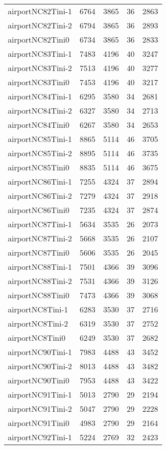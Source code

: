 \begin{longtable}{lrrrr}
airportNC82Tini-1 & 6764 & 3865 & 36 & 2863 \\
airportNC82Tini-2 & 6794 & 3865 & 36 & 2893 \\
airportNC82Tini0 & 6734 & 3865 & 36 & 2833 \\
airportNC83Tini-1 & 7483 & 4196 & 40 & 3247 \\
airportNC83Tini-2 & 7513 & 4196 & 40 & 3277 \\
airportNC83Tini0 & 7453 & 4196 & 40 & 3217 \\
airportNC84Tini-1 & 6295 & 3580 & 34 & 2681 \\
airportNC84Tini-2 & 6327 & 3580 & 34 & 2713 \\
airportNC84Tini0 & 6267 & 3580 & 34 & 2653 \\
airportNC85Tini-1 & 8865 & 5114 & 46 & 3705 \\
airportNC85Tini-2 & 8895 & 5114 & 46 & 3735 \\
airportNC85Tini0 & 8835 & 5114 & 46 & 3675 \\
airportNC86Tini-1 & 7255 & 4324 & 37 & 2894 \\
airportNC86Tini-2 & 7279 & 4324 & 37 & 2918 \\
airportNC86Tini0 & 7235 & 4324 & 37 & 2874 \\
airportNC87Tini-1 & 5634 & 3535 & 26 & 2073 \\
airportNC87Tini-2 & 5668 & 3535 & 26 & 2107 \\
airportNC87Tini0 & 5606 & 3535 & 26 & 2045 \\
airportNC88Tini-1 & 7501 & 4366 & 39 & 3096 \\
airportNC88Tini-2 & 7531 & 4366 & 39 & 3126 \\
airportNC88Tini0 & 7473 & 4366 & 39 & 3068 \\
airportNC8Tini-1 & 6283 & 3530 & 37 & 2716 \\
airportNC8Tini-2 & 6319 & 3530 & 37 & 2752 \\
airportNC8Tini0 & 6249 & 3530 & 37 & 2682 \\
airportNC90Tini-1 & 7983 & 4488 & 43 & 3452 \\
airportNC90Tini-2 & 8013 & 4488 & 43 & 3482 \\
airportNC90Tini0 & 7953 & 4488 & 43 & 3422 \\
airportNC91Tini-1 & 5013 & 2790 & 29 & 2194 \\
airportNC91Tini-2 & 5047 & 2790 & 29 & 2228 \\
airportNC91Tini0 & 4983 & 2790 & 29 & 2164 \\
airportNC92Tini-1 & 5224 & 2769 & 32 & 2423 \\

\end{longtable}
